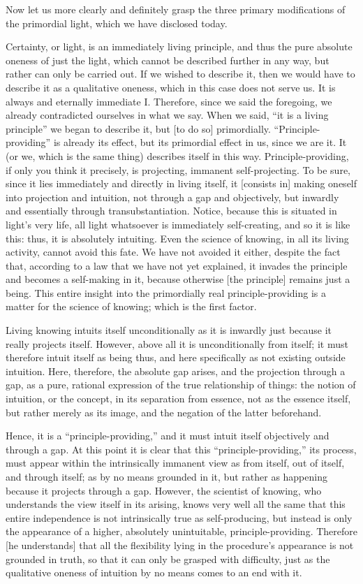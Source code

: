 Now let us more clearly and definitely grasp
the three primary modifications of the primordial light,
which we have disclosed today.

Certainty, or light, is an immediately living principle,
and thus the pure absolute oneness of just the light,
which cannot be described further in any way,
but rather can only be carried out.
If we wished to describe it, then we would have to
describe it as a qualitative oneness,
which in this case does not serve us.
It is always and eternally immediate I.
Therefore, since we said the foregoing,
we already contradicted ourselves in what we say.
When we said, “it is a living principle”
we began to describe it, but [to do so] primordially.
“Principle-providing” is already its effect,
but its primordial effect in us, since we are it.
It (or we, which is the same thing) describes itself in this way.
Principle-providing, if only you think it precisely, is
projecting, immanent self-projecting.
To be sure, since it lies immediately and directly in living itself,
it [consists in] making oneself into projection and intuition,
not through a gap and objectively,
but inwardly and essentially through transubstantiation.
Notice, because this is situated in light's very life,
all light whatsoever is immediately self-creating,
and so it is like this:
thus, it is absolutely intuiting.
Even the science of knowing, in all its living activity,
cannot avoid this fate.
We have not avoided it either, despite the fact that,
according to a law that we have not yet explained,
it invades the principle and becomes a self-making in it,
because otherwise [the principle] remains just a being.
This entire insight into
the primordially real principle-providing is
a matter for the science of knowing;
which is the first factor.

Living knowing intuits itself
unconditionally as it is inwardly
just because it really projects itself.
However, above all it is unconditionally from itself;
it must therefore intuit itself as being thus,
and here specifically as not existing outside intuition.
Here, therefore, the absolute gap arises,
and the projection through a gap,
as a pure, rational expression
of the true relationship of things:
the notion of intuition,
or the concept,
in its separation from essence,
not as the essence itself,
but rather merely as its image,
and the negation of the latter beforehand.

Hence, it is a “principle-providing,”
and it must intuit itself objectively and through a gap.
At this point it is clear that this “principle-providing,”
its process, must appear within the intrinsically immanent view as
from itself, out of itself, and through itself;
as by no means grounded in it, but rather as happening
because it projects through a gap.
However, the scientist of knowing,
who understands the view itself in its arising,
knows very well all the same that this entire independence is
not intrinsically true as self-producing,
but instead is only the appearance of a higher,
absolutely unintuitable, principle-providing.
Therefore [he understands] that all the flexibility
lying in the procedure's appearance is not grounded in truth,
so that it can only be grasped with difficulty,
just as the qualitative oneness of intuition
by no means comes to an end with it.

